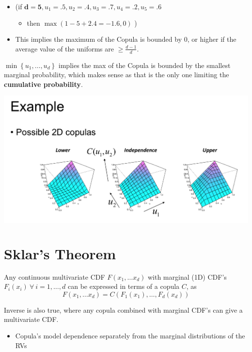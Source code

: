 \documentclass[
  oneside]{book}
\providecommand{\tightlist}{%
  \setlength{\itemsep}{0pt}\setlength{\parskip}{0pt}}
\begin{document}
\begin{itemize}
\tightlist
\item
  (if \(\mathbf{d=5}, u_{1}=.5,u_{2}=.4,u_{3}=.7,u_{4}=.2,u_{5}=.6\)

  \begin{itemize}
  \tightlist
  \item
    then \(\max(1-5+2.4 = \mathbf{-1.6},0)\) )
  \end{itemize}
\item
  This implies the maximum of the Copula is bounded by 0, or higher if the average value of the uniforms are \(\geq\frac{d-1}{d}\).
\end{itemize}

\(\min \left\{u_1, \ldots, u_d\right\}\) implies the max of the Copula is bounded by the smallest marginal probability, which makes sense as that is the only one limiting the \textbf{cumulative probability}.

\includegraphics{Notes/Obsidian-Attachments/4-Multivariate-Return-Modelling-1.png}

\hypertarget{sklars-theorem}{%
\section{Sklar's Theorem}\label{sklars-theorem}}

Any continuous multivariate CDF \(F(x_{1}, \dots x_{d})\) with marginal (1D) CDF's \(F_{i}(x_{i}) \ \forall \ i=1,\dots,d\) can be expressed in terms of a copula \(C\), as
\[
F(x_{1},\dots x_{d}) = C(F_{1}(x_{1}), \dots, F_{d}(x_{d}))
\]

Inverse is also true, where any copula combined with marginal CDF's can give a multivariate CDF.

\begin{itemize}
\tightlist
\item
  Copula's model dependence separately from the marginal distributions of the RVs
\end{itemize}
\end{document}
